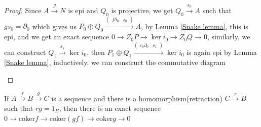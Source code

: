 \documentclass[main]{subfiles}
\begin{document}
\begin{proof}
Since $A\xrightarrow{g}N$ is epi and $Q_0$ is projective, we get $Q_0\xrightarrow{s_0}A$ such that $gs_0=\partial_0$ which gives us $P_0\oplus Q_0\xrightarrow{\begin{pmatrix} f\partial_0 & s_0 \end{pmatrix}}A$, by Lemma \ref{Snake lemma}, this is epi, and we get an exact sequence $0\to Z_0P\to \ker i_0\to Z_0Q\to0$, similarly, we can construct $Q_1\xrightarrow{s_1}\ker i_0$, then $P_1\oplus Q_1\xrightarrow{\begin{pmatrix} \iota_0\partial_0 & s_1 \end{pmatrix}}\ker i_0$ is again epi by Lemma \ref{Snake lemma}, inductively, we can construct the commutative diagram
\begin{center}
\end{center}
\end{proof}

\begin{lemma}\label{Lemma for universal coefficient theorem for cohomology}
If $A\xrightarrow{f} B\xrightarrow{g} C$ is a sequence and there is a homomorphism(retraction) $C\xrightarrow{r} B$ such that $rg=1_B$, then there is an exact sequence $0\to \mathrm{coker}f\to\mathrm{coker}(gf)\to\mathrm{coker}g\to0$
\end{lemma}
\end{document}
